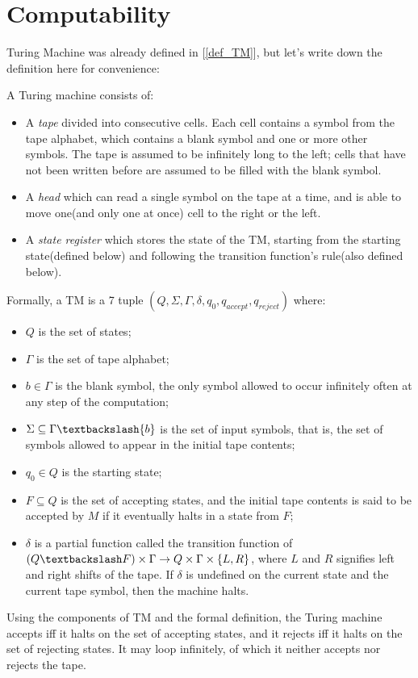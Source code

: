 

    \section{Computability}
    
    Turing Machine was already defined in [\ref{def_TM}], but let's write down the definition here for convenience:
    
    \begin{defn}
		A Turing machine consists of:
		\begin{itemize}
			\item A \emph{tape} divided into consecutive cells. Each cell contains a symbol from the tape alphabet, which contains a blank symbol and one or more other symbols. The tape is assumed to be infinitely long to the left; cells that have not been written before are assumed to be filled with the blank symbol.
			\item A \emph{head} which can read a single symbol on the tape at a time, and is able to move one(and only one at once) cell to the right or the left.
				\item A \emph{state register} which stores the state of the TM, starting from the starting state(defined below) and following the transition function's rule(also defined below).
		\end{itemize}
		Formally, a TM is a 7 tuple $(Q,\Sigma,\Gamma,\delta,q_0,q_{accept},q_{reject})$ where:
		\begin{itemize}
			\item $Q$ is the set of states;
			\item $\Gamma$ is the set of tape alphabet;
			\item $b \in \Gamma$ is the blank symbol, the only symbol allowed to occur infinitely often at any step of the computation;
			\item $\Sigma \subseteq \Gamma \textbackslash \{b\}$ is the set of input symbols, that is, the set of symbols allowed to appear in the initial tape contents;
			\item $q_0 \in Q$ is the starting state;
			\item $F \subseteq Q$ is the set of accepting states, and the initial tape contents is said to be accepted by $M$ if it eventually halts in a state from $F$;
			\item $\delta$ is a partial function called the transition function of $(Q \textbackslash F) \times \Gamma \rightarrow Q \times \Gamma \times \{L,R\}$, where $L$ and $R$ signifies left and right shifts of the tape. If $\delta$ is undefined on the current state and the current tape symbol, then the machine halts.
			\end{itemize}
			Using the components of TM and the formal definition, the Turing machine accepts iff it halts on the set of accepting states, and it rejects iff it halts on the set of rejecting states. It may loop infinitely, of which it neither accepts nor rejects the tape.
		\end{defn}
	
